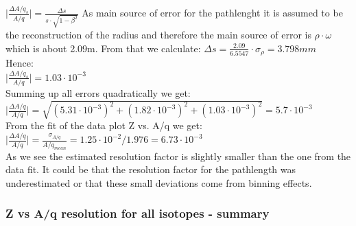 \documentclass[12pt, letterpaper]{article}
\begin{document}
$\big|\frac{\Delta A/q_{s}}{A/q}\big| = \frac{\Delta s}{s\cdot \sqrt{1- \beta^{2}}}$
As main source of error for the pathlenght it is assumed to be the reconstruction of the radius and therefore the main source of error is $\rho \cdot \omega$ which is about 2.09m. From that we calculate: 
$\Delta s = \frac{2.09}{6.5547}\cdot \sigma_{\rho} = 3.798mm $ \\
Hence:\\
$\big|\frac{\Delta A/q_{s}}{A/q}\big| = 1.03 \cdot 10^{-3}$\\
\newline
Summing up all errors quadratically we get:\\
$\Big|\frac{\Delta A/q}{A/q}\Big| = \sqrt{ (5.31\cdot 10^{-3})^{2} + (1.82 \cdot 10^{-3})^{2} + (1.03 \cdot 10^{-3})^{2}} = 5.7 \cdot 10^{-3}$ \\ 
\newline
From the fit of the data plot Z vs. A/q we get:\\
$\Big|\frac{\Delta A/q}{A/q}\Big| = \frac{\sigma_{A/q}}{A/q_{mean}} = 1.25 \cdot 10^{-2}/1.976 = 6.73 \cdot 10^{-3}$\\
\newline
As we see the estimated resolution factor is slightly smaller than the one from the data fit. It could be that the resolution factor for the pathlength was underestimated or that these small deviations come from binning effects.\\

\subsubsection{Z vs A/q resolution for all isotopes - summary}
\end{document}
